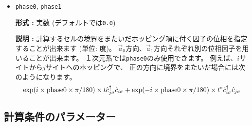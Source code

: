 \begin{itemize}
\item \verb|phase0|, \verb|phase1|

  {\bf 形式 :} 実数 (デフォルトでは\verb|0.0|)
  
  {\bf 説明 :} 計算するセルの境界をまたいだホッピング項に付く因子の位相を指定することが出来ます
  (単位: 度)。
  $\vec{a}_0$方向、$\vec{a}_1$方向それぞれ別の位相因子を用いることが出来ます。
  １次元系では\verb|phase0|のみ使用できます。
  例えば、$i$サイトから$j$サイトへのホッピングで、
  正の方向に境界をまたいだ場合には次のようになります。
  \begin{align}
    \exp(i \times {\rm phase0}\times\pi/180) \times t {\hat c}_{j \sigma}^\dagger {\hat c}_{i \sigma}
    + \exp(-i \times {\rm phase0}\times\pi/180) \times t^* {\hat c}_{i \sigma}^\dagger {\hat c}_{j \sigma}
  \end{align}

\end{itemize}

\subsection{計算条件のパラメーター}

